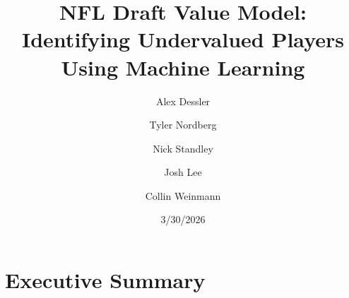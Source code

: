 \documentclass[11pt]{article}
\title{\textbf{NFL Draft Value Model: Identifying Undervalued Players Using Machine Learning}}
\author{Alex Dessler}
\author{Tyler Nordberg}
\author{Nick Standley}
\author{Josh Lee}
\author{Collin Weinmann}
\affil{Texas A\&M University}
\date{3/30/2026}
\begin{document}
\maketitle
\thispagestyle{empty}


\section{Executive Summary}

\end{document}
